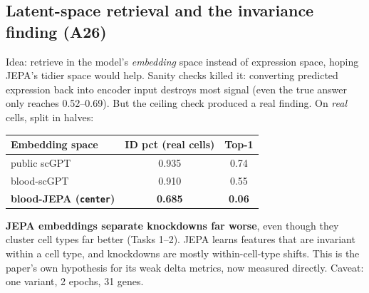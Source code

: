 \documentclass[11pt]{article}
\newcommand{\code}[1]{\texttt{\small #1}}
\begin{document}
\subsection{Latent-space retrieval and the invariance finding (A26)}
Idea: retrieve in the model's \emph{embedding} space instead of expression space, hoping JEPA's tidier space would help. Sanity checks killed it: converting predicted expression back into encoder input destroys most signal (even the true answer only reaches 0.52--0.69). But the ceiling check produced a real finding. On \emph{real} cells, split in halves:
\begin{center}\small
\begin{tabular}{lcc}
\toprule
Embedding space & ID pct (real cells) & Top-1\\
\midrule
public scGPT & 0.935 & 0.74\\
blood-scGPT & 0.910 & 0.55\\
\textbf{blood-JEPA (\code{center})} & \textbf{0.685} & \textbf{0.06}\\
\bottomrule
\end{tabular}
\end{center}
\textbf{JEPA embeddings separate knockdowns far worse}, even though they cluster cell types far better (Tasks 1--2). JEPA learns features that are invariant within a cell type, and knockdowns are mostly within-cell-type shifts. This is the paper's own hypothesis for its weak delta metrics, now measured directly. Caveat: one variant, 2 epochs, 31 genes.

\end{document}
